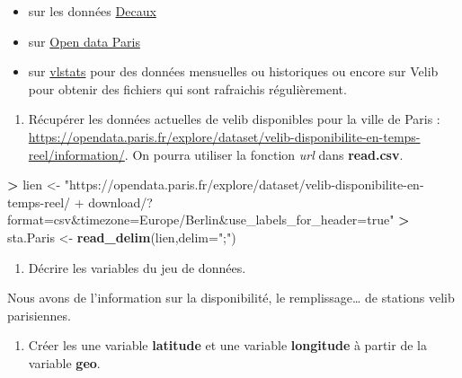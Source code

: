 \documentclass[]{book}
\newenvironment{Shaded}{\begin{snugshade}}{\end{snugshade}}
\newcommand{\DataTypeTok}[1]{\textcolor[rgb]{0.13,0.29,0.53}{#1}}
\newcommand{\KeywordTok}[1]{\textcolor[rgb]{0.13,0.29,0.53}{\textbf{#1}}}
\newcommand{\NormalTok}[1]{#1}
\newcommand{\OperatorTok}[1]{\textcolor[rgb]{0.81,0.36,0.00}{\textbf{#1}}}
\newcommand{\StringTok}[1]{\textcolor[rgb]{0.31,0.60,0.02}{#1}}
\providecommand{\tightlist}{%
  \setlength{\itemsep}{0pt}\setlength{\parskip}{0pt}}
\theoremstyle{definition}
\theoremstyle{definition}
\theoremstyle{definition}
\theoremstyle{remark}
\begin{document}
\begin{itemize}
\tightlist
\item
  sur les données \href{https://developer.jcdecaux.com/\#/opendata/vls?page=getstarted}{Decaux}
\item
  sur \href{https://opendata.paris.fr/pages/home/}{Open data Paris}
\item
  sur \href{http://vlsstats.ifsttar.fr/rawdata}{vlstats} pour des données mensuelles ou historiques ou encore sur Velib pour obtenir des fichiers qui sont rafraichis
  régulièrement.
\end{itemize}

\begin{enumerate}
\def\labelenumi{\arabic{enumi}.}
\tightlist
\item
  Récupérer les données actuelles de velib disponibles pour la ville de Paris : \url{https://opendata.paris.fr/explore/dataset/velib-disponibilite-en-temps-reel/information/}. On pourra utiliser la fonction \emph{url} dans \textbf{read.csv}.
\end{enumerate}

\begin{Shaded}
\begin{Highlighting}[]
\OperatorTok{>}\StringTok{ }\NormalTok{lien <-}\StringTok{ "https://opendata.paris.fr/explore/dataset/velib-disponibilite-en-temps-reel/}
\StringTok{+ download/?format=csv&timezone=Europe/Berlin&use_labels_for_header=true"}
\OperatorTok{>}\StringTok{ }\NormalTok{sta.Paris <-}\StringTok{ }\KeywordTok{read_delim}\NormalTok{(lien,}\DataTypeTok{delim=}\StringTok{";"}\NormalTok{)}
\end{Highlighting}
\end{Shaded}

\begin{enumerate}
\def\labelenumi{\arabic{enumi}.}
\setcounter{enumi}{1}
\tightlist
\item
  Décrire les variables du jeu de données.
\end{enumerate}

Nous avons de l'information sur la disponibilité, le remplissage\ldots{} de stations velib parisiennes.

\begin{enumerate}
\def\labelenumi{\arabic{enumi}.}
\setcounter{enumi}{2}
\tightlist
\item
  Créer les une variable \textbf{latitude} et une variable \textbf{longitude} à partir de la variable \textbf{geo}.
\end{enumerate}
\end{document}
